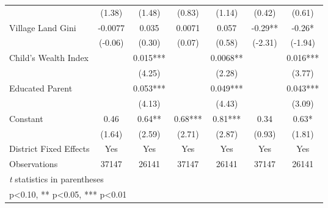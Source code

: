 \begin{sidewaystable}[htbp]
\begin{tabular}{l*{6}{c}}
                &   (1.38)   &   (1.48)   &   (0.83)   &   (1.14)   &   (0.42)   &   (0.61)   \\
Village Land Gini&  -0.0077   &    0.035   &   0.0071   &    0.057   &    -0.29** &    -0.26*  \\
                &  (-0.06)   &   (0.30)   &   (0.07)   &   (0.58)   &  (-2.31)   &  (-1.94)   \\
Child's Wealth Index&            &    0.015***&            &   0.0068** &            &    0.016***\\
                &            &   (4.25)   &            &   (2.28)   &            &   (3.77)   \\
Educated Parent &            &    0.053***&            &    0.049***&            &    0.043***\\
                &            &   (4.13)   &            &   (4.43)   &            &   (3.09)   \\
Constant        &     0.46   &     0.64** &     0.68***&     0.81***&     0.34   &     0.63*  \\
                &   (1.64)   &   (2.59)   &   (2.71)   &   (2.87)   &   (0.93)   &   (1.81)   \\
District Fixed Effects&      Yes   &      Yes   &      Yes   &      Yes   &      Yes   &      Yes   \\
\midrule
Observations    &    37147   &    26141   &    37147   &    26141   &    37147   &    26141   \\
\bottomrule
\multicolumn{7}{l}{\footnotesize \textit{t} statistics in parentheses}\\
\multicolumn{7}{l}{\footnotesize * p<0.10, ** p<0.05, *** p<0.01}\\
\end{tabular}
\end{sidewaystable}
